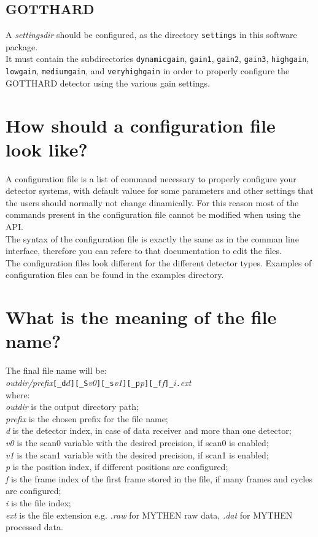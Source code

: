 \subsection{GOTTHARD}
A \textit{settingsdir} should be configured, as the directory  \verb=settings= in this software package.\\
It must contain the subdirectories \verb=dynamicgain=, \verb=gain1=,  \verb=gain2=,  \verb=gain3=,  \verb=highgain=,  \verb=lowgain=,  \verb=mediumgain=, and   \verb=veryhighgain= in order to properly configure the GOTTHARD detector using the various gain settings.


\section{How should a configuration file look like?}

A configuration file is a list of command necessary to properly configure your detector systems, with default valuee for some parameters and other settings that the users should normally not change dinamically.
For this reason most of the commands present in the configuration file cannot be modified when using the API.\\
The syntax of the configuration file is exactly the same as in the comman line interface, therefore you can refere to that documentation to edit the files.\\
The configuration files look different for the different detector types. Examples of configuration files can be found in the examples directory.

\section{What is the meaning of the file name?}
The final file name will be: \\
\textit{outdir/prefix}\verb=[_d=$d$\verb=][_S=\textit{v0}\verb=][_s=\textit{v1}\verb=][_p=\textit{p}\verb=][_f=\textit{f}\verb=]_=\textit{i}\verb=.=\textit{ext}\\
where: \\
\textit{outdir} is the output directory path;\\
\textit{prefix} is the chosen prefix for the file name;\\
\textit{d} is the detector index, in case of data receiver and more than one detector;\\
\textit{v0} is the scan0 variable with the desired precision, if scan0 is enabled;\\
\textit{v1} is the scan1 variable with the desired precision, if scan1 is enabled;\\
\textit{p} is the position index, if different positions are configured;\\
\textit{f} is the frame index of the first frame stored in the file, if many frames and cycles are configured;\\
\textit{i} is the file index;\\
\textit{ext} is the file extension e.g. \textit{.raw} for MYTHEN raw data, \textit{.dat} for MYTHEN processed data.

